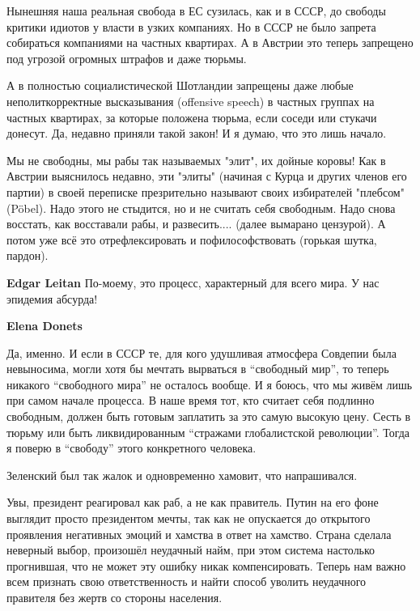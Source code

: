 \begin{itemize}
Нынешняя наша реальная свобода в ЕС сузилась, как и в СССР, до свободы критики
идиотов у власти в узких компаниях. Но в СССР не было запрета собираться
компаниями на частных квартирах. А в Австрии это теперь запрещено под угрозой
огромных штрафов и даже тюрьмы. 

А в полностью социалистической Шотландии запрещены даже любые неполиткорректные
высказывания (offensive speech) в частных группах на частных квартирах, за
которые положена тюрьма, если соседи или стукачи донесут. Да, недавно приняли
такой закон! И я думаю, что это лишь начало.

\begin{itemize} %

Мы не свободны, мы рабы так называемых "элит", их дойные коровы! Как в Австрии
выяснилось недавно, эти "элиты" (начиная с Курца и других членов его партии) в
своей переписке презрительно называют своих избирателей "плебсом" (Pöbel). Надо
этого не стыдится, но и не считать себя свободным. Надо снова восстать, как
восставали рабы, и развесить.... (далее вымарано цензурой). А потом уже всё это
отрефлексировать и пофилософствовать (горькая шутка, пардон).


\textbf{Edgar Leitan} По-моему, это процесс, характерный для всего мира. У нас эпидемия абсурда!

\textbf{Elena Donets} 

Да, именно. И если в СССР те, для кого удушливая атмосфера Совдепии была
невыносима, могли хотя бы мечтать вырваться в \enquote{свободный мир}, то теперь
никакого \enquote{свободного мира} не осталось вообще. И я боюсь, что мы живём лишь при
самом начале процесса. В наше время тот, кто считает себя подлинно свободным,
должен быть готовым заплатить за это самую высокую цену. Сесть в тюрьму или
быть ликвидированным \enquote{стражами глобалистской революции}. Тогда я поверю в
\enquote{свободу} этого конкретного человека.

\end{itemize} %

Зеленский был так жалок и одновременно хамовит, что напрашивался.


Увы, президент реагировал как раб, а не как правитель. Путин на его фоне
выглядит просто президентом мечты, так как не опускается до открытого
проявления негативных эмоций и хамства в ответ на хамство. Страна сделала
неверный выбор, произошёл неудачный найм, при этом система настолько
прогнившая, что не может эту ошибку никак компенсировать. Теперь нам важно всем
признать свою ответственность и найти способ уволить неудачного правителя без
жертв со стороны населения.


\end{itemize}
